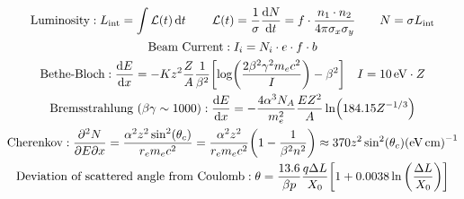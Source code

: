 \begin{gather*}
        \text{Luminosity}:
        L_{\mathrm{int}} = \int\Lc(t)\dd{t}
        \qquad
        \Lc(t)
        = \frac{1}{\sigma}\dv{N}{t}
        = f\cdot\frac{n_1\cdot n_2}{4\pi\sigma_x\sigma_y}
        \qquad
        N = \sigma L_{\mathrm{int}}
        \\
        \text{Beam Current}:
        I_i = N_i\cdot e\cdot f\cdot b
        \\
        \text{Bethe-Bloch}:
        \dv{E}{x} = -Kz^2 \frac{Z}{A}\frac{1}{\beta^2}\qty[\log(\frac{2\beta^2\gamma^2 m_ec^2}{I}) - \beta^2]
        \quad
        I = \SI{10}{eV}\cdot Z
        \\
        \text{Bremsstrahlung } (\beta\gamma\sim 1000):
        \dv{E}{x} = -\frac{4\alpha^3N_A}{m_e^2}\frac{EZ^2}{A}\ln(184.15Z^{-1/3})
        \\
        \text{Cherenkov}:
        \pdv{N}{E}{x}
        = \frac{\alpha^2z^2\sin[2](\theta_c)}{r_em_ec^2}
        = \frac{\alpha^2z^2}{r_em_ec^2}\qty(1-\frac{1}{\beta^2n^2})
        \approx 370z^2\sin[2](\theta_c) \unit{(eV.cm)^{-1}}
        \\
        \text{Deviation of scattered angle from Coulomb}:
        \theta = \frac{13.6}{\beta p}\frac{q\Delta L}{X_0}\qty[1 + 0.0038\ln\qty(\frac{\Delta L}{X_0})]
\end{gather*}
